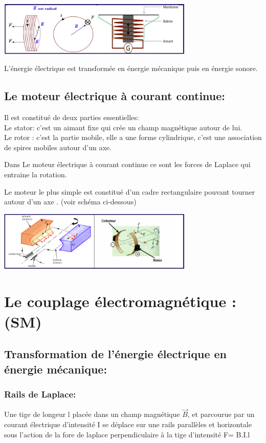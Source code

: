 \documentclass[12pt]{article}
\begin{document}
   \begin{center}
    \includegraphics[width=0.7\textwidth]{./img/fonction_haut_par.png}
  \end{center}

L’énergie électrique est transformée en énergie mécanique puis en énergie sonore.

\subsection{Le moteur électrique à courant continue:}
Il est constitué de deux parties essentielles:
\\Le stator: c’est un aimant fixe qui crée un champ magnétique autour de lui.
\\Le rotor : c'est la partie mobile, elle a une forme cylindrique, c'est une association de spires mobiles autour d'un axe.

Dans Le moteur électrique à courant continue ce sont les forces de Laplace qui entraine la rotation.

Le moteur le plus simple est constitué d’un cadre rectangulaire pouvant tourner autour d’un axe . (voir schéma ci-dessous)

   \begin{center}
    \includegraphics[width=0.7\textwidth]{./img/mcc_app.png}
  \end{center}

\section{Le couplage électromagnétique : (SM)}
\subsection{Transformation de l'énergie électrique en énergie mécanique:}
\subsubsection{Rails de Laplace:}
Une tige de longeur l placée dans un champ magnétique $\vec{B}$, et parcourue par un courant électrique d'intensité I se déplace sur une rails parallèles et horizontale sous l'action de la fore de laplace perpendiculaire à la tige d'intensité F= B.I.l 
\end{document}

